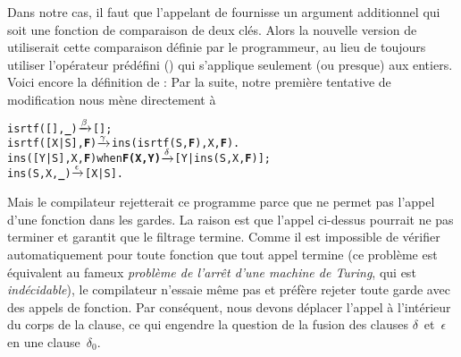 Dans notre cas, il faut que l'appelant de  fournisse
un argument additionnel qui soit une fonction de comparaison de deux
clés. Alors la nouvelle version de  utiliserait cette
comparaison définie par le programmeur, au lieu de toujours utiliser
l'opérateur prédéfini (\erlcode{>}) qui s'applique seulement (ou
presque) aux entiers. Voici encore la définition de :
 Par la suite, notre première tentative de
modification nous mène directement à
\begin{alltt}
isrtf(   [],\textbf{\_})             \(\smashedrightarrow{\beta}\) [];
isrtf([X|S],\textbf{F})             \(\smashedrightarrow{\gamma}\) ins(isrtf(S,\textbf{F}),X,\textbf{F}).
ins([Y|S],X,\textbf{F}) when \textbf{F(X,Y)} \(\smashedrightarrow{\delta}\) [Y|ins(S,X,\textbf{F})];
ins(    S,X,\textbf{\_})             \(\smashedrightarrow{\epsilon}\) [X|S].
\end{alltt}
Mais le compilateur rejetterait ce programme parce que \Erlang ne
permet pas l'appel d'une fonction dans les gardes. La raison est que
l'appel  ci-dessus pourrait ne pas terminer et \Erlang
garantit que le filtrage termine. Comme il est impossible de vérifier
automatiquement pour toute fonction que tout appel termine (ce
problème est équivalent au fameux \emph{problème de l'arrêt d'une
  machine de Turing}, qui est \emph{indécidable}), le compilateur
n'essaie même pas et préfère rejeter toute garde avec des appels de
fonction. Par conséquent, nous devons déplacer l'appel
 à l'intérieur du corps de la clause, ce qui engendre
la question de la fusion des clauses \(\delta\)~et~\(\epsilon\) en une
clause~\(\delta_0\).

